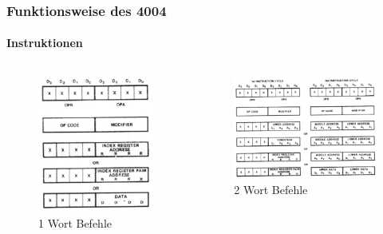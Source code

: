 \begin{frame}
	\frametitle{Funktionsweise des 4004}
	\framesubtitle{Instruktionen}
	\begin{columns}[c]
		\begin{column}{.4\textwidth}	
			\begin{figure}[ht]
				\includegraphics[width=0.9\linewidth]{images/instruction_one.png}
				\caption{1 Wort Befehle}
			\end{figure}
		\end{column}
		\pause
		\begin{column}{.7\textwidth}
			\begin{figure}[ht]
				\includegraphics[width=0.9\linewidth]{images/instruction_two.png}
				\caption{2 Wort Befehle}
			\end{figure}
		\end{column}
	\end{columns}
\end{frame}

